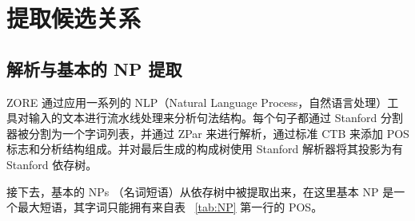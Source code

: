 \section{提取候选关系}

\subsection{解析与基本的 NP 提取}
ZORE 通过应用一系列的 NLP（Natural Language Process，自然语言处理）工具对输入的文本进行流水线处理来分析句法结构。每个句子都通过 Stanford 分割器\citep{chang2008}被分割为一个字词列表，并通过 ZPar \citep{zhang2011}来进行解析，通过标准 CTB \citep{xue2005}来添加 POS 标志和分析结构组成。并对最后生成的构成树使用 Stanford 解析器\citep{chang2008}将其投影为有 Stanford 依存树。

接下去，基本的 NPs （名词短语）从依存树中被提取出来，在这里基本 NP 是一个最大短语，其字词只能拥有来自表 ~\ref{tab:NP} 第一行的 POS。

